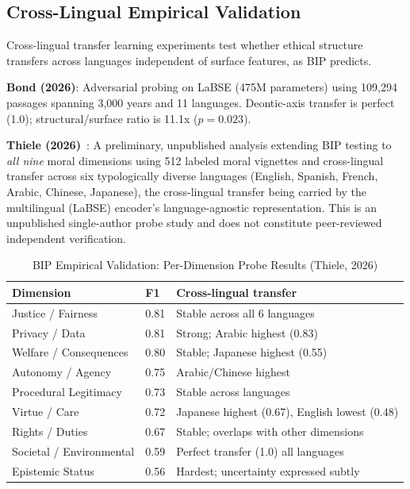 \documentclass[conference]{IEEEtran}
\begin{document}
\subsection{Cross-Lingual Empirical Validation}

Cross-lingual transfer learning experiments test whether ethical structure transfers across languages independent of surface features, as BIP predicts.

\textbf{Bond (2026)}: Adversarial probing on LaBSE (475M parameters) using 109,294 passages spanning 3,000 years and 11 languages. Deontic-axis transfer is perfect (1.0); structural/surface ratio is 11.1x ($p=0.023$).

\textbf{Thiele (2026)}~\cite{thiele2026}: A preliminary, unpublished analysis extending BIP testing to \emph{all nine} moral dimensions using 512 labeled moral vignettes and cross-lingual transfer across six typologically diverse languages (English, Spanish, French, Arabic, Chinese, Japanese), the cross-lingual transfer being carried by the multilingual (LaBSE) encoder's language-agnostic representation. This is an unpublished single-author probe study and does not constitute peer-reviewed independent verification.

\begin{table}[t]
\caption{BIP Empirical Validation: Per-Dimension Probe Results (Thiele, 2026)}
\label{tab:bip-results}
\centering
\footnotesize
\begin{tabular}{@{}p{2.8cm}p{0.8cm}p{3.5cm}@{}}
\toprule
Dimension & F1 & Cross-lingual transfer \\
\midrule
Justice / Fairness & 0.81 & Stable across all 6 languages \\
Privacy / Data & 0.81 & Strong; Arabic highest (0.83) \\
Welfare / Consequences & 0.80 & Stable; Japanese highest (0.55) \\
Autonomy / Agency & 0.75 & Arabic/Chinese highest \\
Procedural Legitimacy & 0.73 & Stable across languages \\
Virtue / Care & 0.72 & Japanese highest (0.67), English lowest (0.48) \\
Rights / Duties & 0.67 & Stable; overlaps with other dimensions \\
Societal / Environmental & 0.59 & Perfect transfer (1.0) all languages \\
Epistemic Status & 0.56 & Hardest; uncertainty expressed subtly \\
\bottomrule
\end{tabular}
\end{table}
\end{document}
